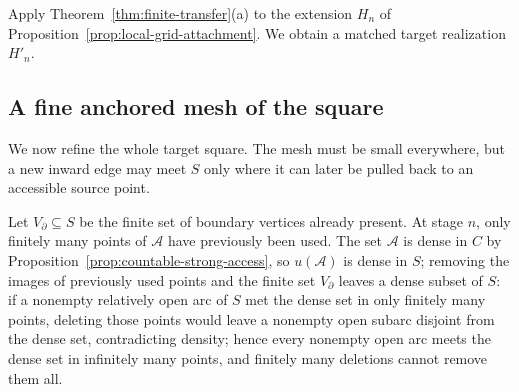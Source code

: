 \documentclass[11pt]{article}
\theoremstyle{mainplain}
\theoremstyle{mainroman}
\theoremstyle{definition}
\numberwithin{equation}{section}
\begin{document}
Apply Theorem~\ref{thm:finite-transfer}\textup{(a)} to the extension
$H_n$ of Proposition~\ref{prop:local-grid-attachment}. We obtain a matched target realization \(H'_n\).

\subsection{A fine anchored mesh of the square}\label{a-fine-anchored-mesh-of-the-square}

We now refine the whole target square. The mesh must be small everywhere, but a new inward edge may meet \(S\) only where it can later be pulled back to an accessible source point.

Let \(V_\partial\subseteq S\) be the finite set of boundary vertices already present. At stage \(n\), only finitely many points of \(\mathcal A\) have previously been used. The set \(\mathcal A\) is dense in \(C\) by Proposition~\ref{prop:countable-strong-access}, so \(u(\mathcal A)\) is dense in \(S\); removing the images of previously used points and the finite set \(V_\partial\) leaves a dense subset of \(S\): if a nonempty relatively open arc of \(S\) met the dense set in only finitely many points, deleting those points would leave a nonempty open subarc disjoint from the dense set, contradicting density; hence every nonempty open arc meets the dense set in infinitely many points, and finitely many deletions cannot remove them all.
\end{document}
